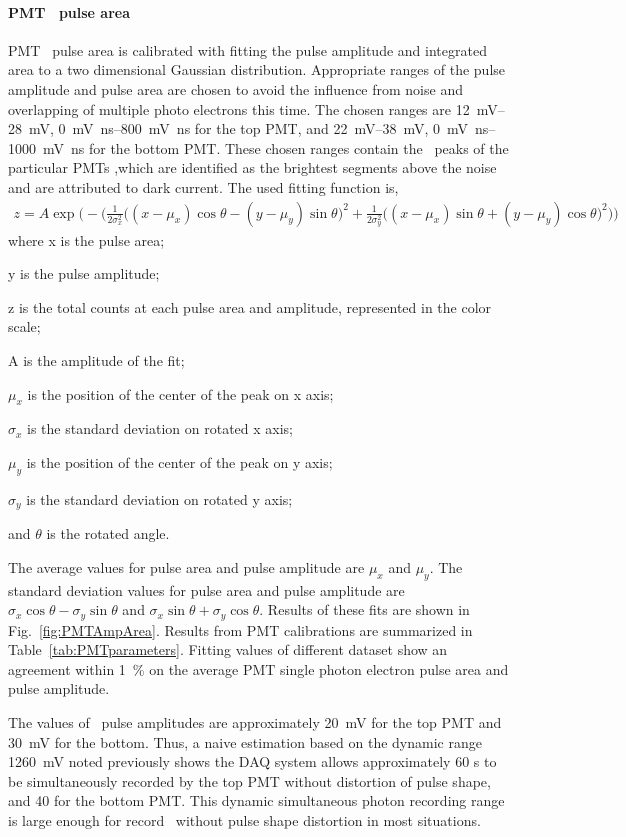 \paragraph{PMT \sphe\ pulse area}
 PMT \sphe\ pulse area is calibrated with fitting the pulse amplitude and integrated area to a two dimensional Gaussian distribution. Appropriate ranges of the pulse amplitude and pulse area are chosen to avoid the influence from noise and overlapping of multiple photo electrons this time. The chosen ranges are \SIrange{12}{28}{\mV}, \SIrange{0}{800}{\mV\ns} for the top PMT, and \SIrange{22}{38}{\mV}, \SIrange{0}{1000}{\mV\ns} for the bottom PMT. These chosen ranges contain the \sphe\ peaks of the particular PMTs ,which are identified as the brightest segments above the noise and are attributed to dark current. The used fitting function is, 
 \begin{align}
 z = 	A \exp \bigg( -\Big(\frac{1}{2 \sigma_x^2} \big( (x-\mu_{x})\cos \theta - (y-\mu_y)\sin \theta \big) ^2 + \frac{1}{2 \sigma_y^2} \big( (x-\mu_{x})\sin \theta + (y-\mu_y)\cos \theta \big) ^2  \Big) \bigg)
 \end{align} 
where x is the pulse area; 

y is the pulse amplitude; 

z is the total counts at each pulse area and amplitude, represented in the color scale; 

A is the amplitude of the fit; 

$\mu_{x}$ is the position of the center of the peak on x axis; 

$\sigma_{x}$ is the standard deviation on rotated x axis; 

$\mu_{y}$ is the position of the center of the peak on y axis; 

$\sigma_{y}$ is the standard deviation on rotated y axis; 

and $\theta$ is the rotated angle.  

The average values for pulse area and pulse amplitude are $\mu_{x}$ and $\mu_{y}$. The standard deviation values for pulse area and pulse amplitude are $\sigma_{x} \cos \theta - \sigma_{y} \sin \theta$ and $\sigma_{x} \sin \theta + \sigma_{y} \cos \theta$. Results of these fits are shown in Fig.~\ref{fig:PMTAmpArea}. Results from PMT calibrations are summarized in Table~\ref{tab:PMTparameters}. Fitting values of different dataset show an agreement within \SI{1}{\percent} on the average PMT single photon electron pulse area and pulse amplitude. 

The values of \sphe\ pulse amplitudes are approximately \SI{20}{\mV} for the top PMT and \SI{30}{\mV} for the bottom. Thus, a naive estimation based on the dynamic range \SI{1260}{\mV} noted previously shows the DAQ system allows approximately 60 \sphe s to be simultaneously recorded by the top PMT without distortion of pulse shape, and 40 for the bottom PMT. This dynamic simultaneous photon recording range is large enough for record \ees\ without pulse shape distortion in most situations. 

